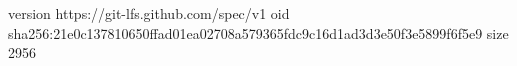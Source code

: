 version https://git-lfs.github.com/spec/v1
oid sha256:21e0c137810650ffad01ea02708a579365fdc9c16d1ad3d3e50f3e5899f6f5e9
size 2956
